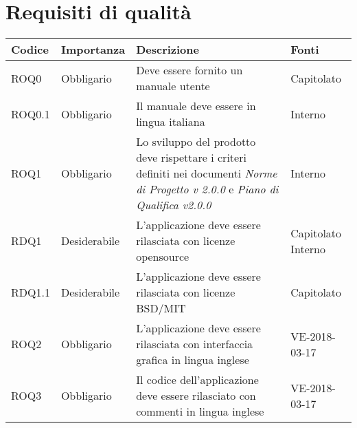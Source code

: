 \documentclass[../AnalisideiRequisiti.tex]{subfiles}
\begin{document}
	\section{Requisiti di qualità}
			\begin{longtable}{| p{2cm} | p{2.5cm} |p{5cm} | p{2.5cm} |}
			\hline
			\textbf{Codice} & \textbf{Importanza} & \textbf{Descrizione} & \textbf{Fonti}\\
			\hline
			\endhead
							
			\newline ROQ0&\newline Obbligario&
			\newline Deve essere fornito un manuale utente&
			\newline Capitolato
			\\[1em]
			\hline
			\newline ROQ0.1&\newline Obbligario&
			\newline Il manuale deve essere in lingua italiana&
			\newline Interno
			\\[1em]
			\hline
			\newline ROQ1&\newline Obbligario&
			\newline Lo sviluppo del prodotto deve rispettare i criteri definiti nei documenti \textit{Norme di Progetto v 2.0.0} e \textit{Piano di Qualifica v2.0.0}&
			\newline Interno
			\\[1em]
			\hline
			\newline
			RDQ1&\newline Desiderabile&
			\newline 
			L'applicazione deve essere rilasciata con licenze opensource&
			\newline Capitolato \newline Interno
			\\[1em]
			\hline	
			\newline
			RDQ1.1&\newline Desiderabile&
			\newline 
			L'applicazione deve essere rilasciata con licenze BSD/MIT &
			\newline Capitolato
			\\[1em]
			\hline	
			\newline
			ROQ2&\newline Obbligario&
			\newline 
			L'applicazione deve essere rilasciata con interfaccia grafica in lingua inglese&
			\newline VE-2018-03-17
			\\[1em]
			\hline	
			\newline
			ROQ3&\newline Obbligario&
			\newline 
			Il codice dell'applicazione deve essere rilasciato con commenti in lingua inglese&
			\newline VE-2018-03-17
			\\[1em]
			\hline
	\end{longtable}
\newpage
\end{document}

